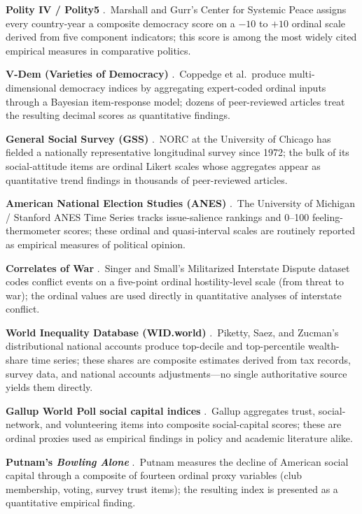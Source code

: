 \documentclass[12pt,openany]{book}
\numberwithin{equation}{chapter}
\begin{document}
\textbf{Polity IV / Polity5} \cite{polityiv}.\ Marshall and Gurr's Center for Systemic Peace assigns every country-year a composite democracy score on a $-10$ to $+10$ ordinal scale derived from five component indicators; this score is among the most widely cited empirical measures in comparative politics.

\textbf{V-Dem (Varieties of Democracy)} \cite{vdem}.\ Coppedge et al.\ produce multi-dimensional democracy indices by aggregating expert-coded ordinal inputs through a Bayesian item-response model; dozens of peer-reviewed articles treat the resulting decimal scores as quantitative findings.

\textbf{General Social Survey (GSS)} \cite{gss_norc}.\ NORC at the University of Chicago has fielded a nationally representative longitudinal survey since 1972; the bulk of its social-attitude items are ordinal Likert scales whose aggregates appear as quantitative trend findings in thousands of peer-reviewed articles.

\textbf{American National Election Studies (ANES)} \cite{anes_cumulative}.\ The University of Michigan / Stanford ANES Time Series tracks issue-salience rankings and 0--100 feeling-thermometer scores; these ordinal and quasi-interval scales are routinely reported as empirical measures of political opinion.

\textbf{Correlates of War} \cite{correlates_of_war}.\ Singer and Small's Militarized Interstate Dispute dataset codes conflict events on a five-point ordinal hostility-level scale (from threat to war); the ordinal values are used directly in quantitative analyses of interstate conflict.

\textbf{World Inequality Database (WID.world)} \cite{piketty_wid}.\ Piketty, Saez, and Zucman's distributional national accounts produce top-decile and top-percentile wealth-share time series; these shares are composite estimates derived from tax records, survey data, and national accounts adjustments---no single authoritative source yields them directly.

\textbf{Gallup World Poll social capital indices} \cite{gallup_social}.\ Gallup aggregates trust, social-network, and volunteering items into composite social-capital scores; these are ordinal proxies used as empirical findings in policy and academic literature alike.

\textbf{Putnam's \textit{Bowling Alone}} \cite{putnam_bowling}.\ Putnam measures the decline of American social capital through a composite of fourteen ordinal proxy variables (club membership, voting, survey trust items); the resulting index is presented as a quantitative empirical finding.
\end{document}
